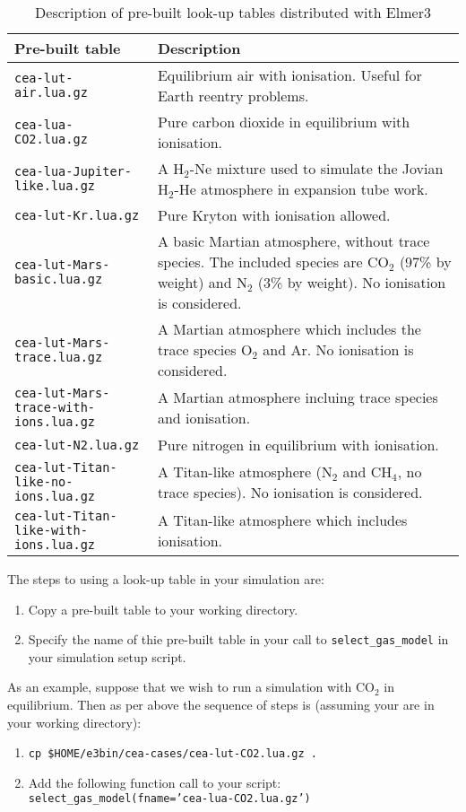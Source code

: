 \begin{table}[ht]
\begin{center}
\caption{Description of pre-built look-up tables distributed with Elmer3}
\label{tab:lut}
\begin{tabular}{lp{8cm}}
 \hline \hline
Pre-built table & Description \\
\hline
\texttt{cea-lut-air.lua.gz} & Equilibrium air with ionisation. Useful for Earth reentry problems. \\
\texttt{cea-lua-CO2.lua.gz} & Pure carbon dioxide in equilibrium with ionisation. \\
\texttt{cea-lua-Jupiter-like.lua.gz} & A H$_2$-Ne mixture used to simulate the Jovian H$_2$-He atmosphere
                                       in expansion tube work. \\
\texttt{cea-lut-Kr.lua.gz} & Pure Kryton with ionisation allowed. \\
\texttt{cea-lut-Mars-basic.lua.gz} & A basic Martian atmosphere, without trace species.  The included species
                                     are CO$_2$ (97\% by weight) and N$_2$ (3\% by weight).  No ionisation is considered. \\
\texttt{cea-lut-Mars-trace.lua.gz} & A Martian atmosphere which includes the trace species O$_2$ and Ar. No ionisation is considered. \\
\texttt{cea-lut-Mars-trace-with-ions.lua.gz} & A Martian atmosphere incluing trace species and ionisation. \\
\texttt{cea-lut-N2.lua.gz} & Pure nitrogen in equilibrium with ionisation. \\
\texttt{cea-lut-Titan-like-no-ions.lua.gz} & A Titan-like atmosphere (N$_2$ and CH$_4$, no trace species). No ionisation is considered. \\
\texttt{cea-lut-Titan-like-with-ions.lua.gz} & A Titan-like atmosphere which includes ionisation. \\
\hline
\end{tabular}
\end{center}
\end{table}

The steps to using a look-up table in your simulation are:
\begin{enumerate}
 \item Copy a pre-built table to your working directory.
 \item Specify the name of thie pre-built table in your call to \texttt{select\_gas\_model} in your
       simulation setup script.
\end{enumerate}
As an example, suppose that we wish to run a simulation with CO$_2$ in equilibrium.
Then as per above the sequence of steps is (assuming your are in your working directory):
\begin{enumerate}
 \item \texttt{cp \$HOME/e3bin/cea-cases/cea-lut-CO2.lua.gz .}
 \item Add the following function call to your script:\\
       \texttt{select\_gas\_model(fname='cea-lua-CO2.lua.gz')}
\end{enumerate}

